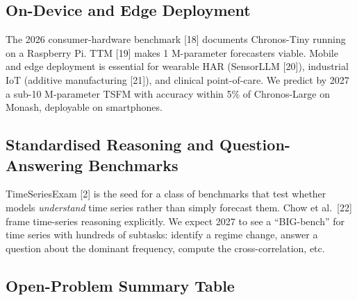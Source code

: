 \subsection{On-Device and Edge Deployment}\label{on-device-and-edge-deployment}

The 2026 consumer-hardware benchmark {[}18{]} documents Chronos-Tiny running on a Raspberry Pi. TTM {[}19{]} makes 1 M-parameter forecasters viable. Mobile and edge deployment is essential for wearable HAR (SensorLLM {[}20{]}), industrial IoT (additive manufacturing {[}21{]}), and clinical point-of-care. We predict by 2027 a sub-10 M-parameter TSFM with accuracy within 5\% of Chronos-Large on Monash, deployable on smartphones.

\subsection{Standardised Reasoning and Question-Answering Benchmarks}\label{standardised-reasoning-and-question-answering-benchmarks}

TimeSeriesExam {[}2{]} is the seed for a class of benchmarks that test whether models \emph{understand} time series rather than simply forecast them. Chow et al.~{[}22{]} frame time-series reasoning explicitly. We expect 2027 to see a ``BIG-bench'' for time series with hundreds of subtasks: identify a regime change, answer a question about the dominant frequency, compute the cross-correlation, etc.

\subsection{Open-Problem Summary Table}\label{open-problem-summary-table}

